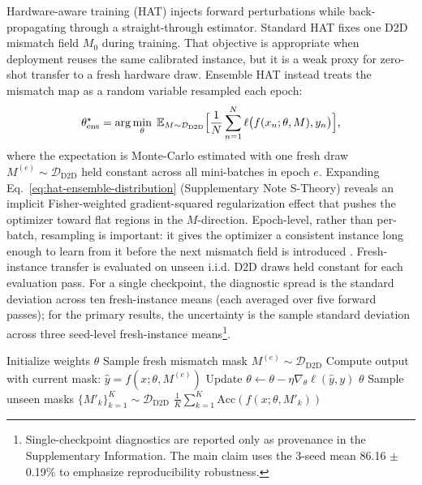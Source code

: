 Hardware-aware training (HAT) injects forward perturbations while back-propagating through a straight-through estimator. Standard HAT fixes one D2D mismatch field $M_{0}$ during training. That objective is appropriate when deployment reuses the same calibrated instance, but it is a weak proxy for zero-shot transfer to a fresh hardware draw. Ensemble HAT instead treats the mismatch map as a random variable resampled each epoch:
\begin{equation}
    \theta_{\text{ens}}^{\star} = \arg\min_{\theta}\;\mathbb{E}_{M\sim\mathcal{D}_{\text{D2D}}}\Bigl[\frac{1}{N}\sum_{n=1}^{N}\ell\bigl(f(x_n;\theta,M),y_n\bigr)\Bigr],
    \label{eq:hat-ensemble-distribution}
\end{equation}
where the expectation is Monte-Carlo estimated with one fresh draw $M^{(e)}\sim\mathcal{D}_{\text{D2D}}$ held constant across all mini-batches in epoch $e$. Expanding Eq.~\ref{eq:hat-ensemble-distribution} (Supplementary Note S-Theory) reveals an implicit Fisher-weighted gradient-squared regularization effect that pushes the optimizer toward flat regions in the $M$-direction. Epoch-level, rather than per-batch, resampling is important: it gives the optimizer a consistent instance long enough to learn from it before the next mismatch field is introduced \citep{tobin2017domain}. Fresh-instance transfer is evaluated on unseen i.i.d. D2D draws held constant for each evaluation pass. For a single checkpoint, the diagnostic spread is the standard deviation across ten fresh-instance means (each averaged over five forward passes); for the primary results, the uncertainty is the sample standard deviation across three seed-level fresh-instance means\footnote{Single-checkpoint diagnostics are reported only as provenance in the Supplementary Information. The main claim uses the 3-seed mean 86.16 $\pm$ 0.19\% to emphasize reproducibility robustness.}.

\begin{algorithm}[H]
\caption{Ensemble Hardware-Aware Training (HAT)}
\label{alg:ensemble-hat}
\begin{algorithmic}[1]
    \State Initialize weights $\theta$
        \State Sample fresh mismatch mask $M^{(e)} \sim \mathcal{D}_{\text{D2D}}$
            \State Compute output with current mask: $\hat{y} = f(x; \theta, M^{(e)})$
            \State Update $\theta \leftarrow \theta - \eta \nabla_{\theta} \ell(\hat{y}, y)$
        \EndFor
    \EndFor
    \State \Return $\theta$
\EndProcedure
{}
    \State Sample unseen masks $\{M'_{k}\}_{k=1}^K \sim \mathcal{D}_{\text{D2D}}$
    \State \Return $\frac{1}{K} \sum_{k=1}^K \text{Acc}(f(x; \theta, M'_k))$
\EndProcedure
\end{algorithmic}
\end{algorithm}


